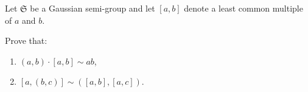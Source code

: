 Let $\mathfrak{S}$ be a Gaussian semi-group and let $[a, b]$ denote a least common multiple of $a$ and $b$.

Prove that:
\begin{enumerate}
  \item $(a, b) \cdot [a, b] \sim a b$,
  \item $[a, (b, c)] \sim ([a, b], [a, c])$.
\end{enumerate}
